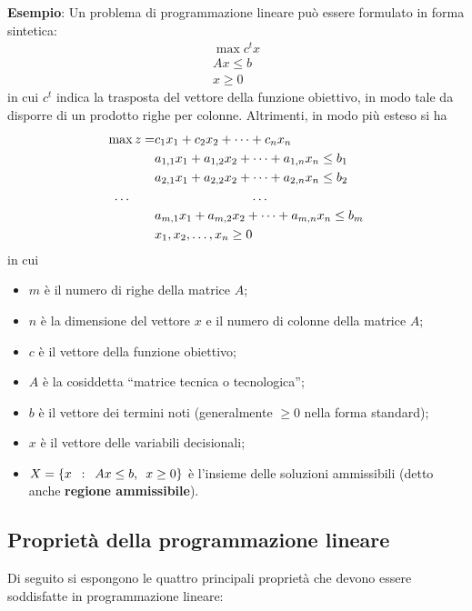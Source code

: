 \documentclass[a4paper]{extarticle}
\newcommand{\quotes}[1]{``#1''}
\begin{document}
\vspace{2em}
\noindent
\textbf{Esempio}: Un problema di programmazione lineare può essere formulato in forma sintetica:
\begin{align*}
    \max c{^t} x\\
    A x \leq b\\
    x \geq 0
\end{align*}
in cui $c{^t}$ indica la trasposta del vettore della funzione obiettivo, in modo tale da disporre di un prodotto righe per colonne. Altrimenti, in modo più esteso si ha
\begin{align*}
    \max z =&c_1x_1+c_2x_2+\dots+c_nx_n\\
            &a_{1,1}x_1+a_{1,2}x_2+\dots+a_{1,n}x_n \leq b_1\\
            &a_{2,1}x_1+a_{2,2}x_2+\dots+a_{2,n}x_n \leq b_2\\
    \dots \hspace{2em} & \hspace{7.5em} \dots\\
            & a_{m,1}x_1+a_{m,2}x_2+\dots+a_{m,n}x_n \leq b_m\\
    & x_1,x_2,\dots,x_n \geq 0
\end{align*}
in cui
\begin{itemize}
    \item $m$ è il numero di righe della matrice $A$;
    \item $n$ è la dimensione del vettore $x$ e il numero di colonne della matrice $A$;
    \item $c$ è il vettore della funzione obiettivo;
    \item $A$ è la cosiddetta \quotes{matrice tecnica o tecnologica};
    \item $b$ è il vettore dei termini noti (generalmente $\geq 0$ nella forma standard);
    \item $x$ è il vettore delle variabili decisionali;
    \item $X = \{x \hspace{0.5em}:\hspace{0.5em} Ax \leq b, \hspace{0.5em} x \geq 0\}$ è l'insieme delle soluzioni ammissibili (detto anche \textbf{regione ammissibile}).
\end{itemize}

\vspace{1em}
\subsection{Proprietà della programmazione lineare}
Di seguito si espongono le quattro principali proprietà che devono essere soddisfatte in programmazione lineare:
\end{document}
